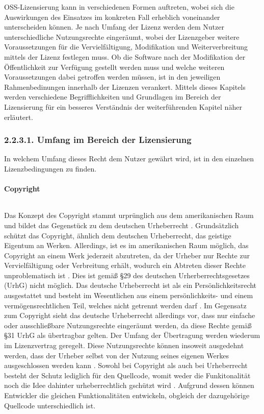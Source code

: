 OSS-Lizensierung kann in verschiedenen Formen auftreten, wobei sich die Auswirkungen des Einsatzes im konkreten Fall erheblich voneinander unterscheiden können. Je nach Umfang der Lizenz werden dem Nutzer unterschiedliche Nutzungsrechte eingeräumt, wobei der Lizenzgeber weitere Voraussetzungen für die Vervielfältigung, Modifikation und Weiterverbreitung mittels der Lizenz festlegen muss. Ob die Software nach der Modifikation der Öffentlichkeit zur Verfügung gestellt werden muss und welche weiteren Voraussetzungen dabei getroffen werden müssen, ist in den jeweiligen Rahmenbedinungen innerhalb der Lizenzen verankert. Mittels dieses Kapitels werden verschiedene Begrifflichkeiten und Grundlagen im Bereich der Lizensierung für ein besseres Verständnis der weiterführenden Kapitel näher erläutert. 

\newpage
\subsubsection{2.2.3.1. Umfang im Bereich der Lizensierung}

In welchem Umfang dieses Recht dem Nutzer gewährt wird, ist in den einzelnen Lizenzbedingungen zu finden. 

\paragraph{Copyright}$~$

Das Konzept des Copyright stammt urprünglich aus dem amerikanischen Raum und bildet das Gegenstück zu dem deutschen Urheberrecht \cite[S. 18]{schaaf_open-source-lizenzen_2013}. Grundsätzlich schützt das Copyright, ähnlich dem deutschen Urheberrecht, das geistige Eigentum an Werken. Allerdings, ist es im amerikanischen Raum möglich, das Copyright an einem Werk jederzeit abzutreten, da der Urheber nur Rechte zur Vervielfältigung oder Verbreitung erhält, wodurch ein Abtreten dieser Rechte unproblematisch ist \cite[S. 45]{bitkom_open_2016}. Dies ist gemäß §29 des deutschen Urherberrechtsgesetzes (UrhG) nicht möglich. Das deutsche Urheberrecht ist als ein Persönlichkeitsrecht ausgestattet und besteht im Wesentlichen aus einem persönlichkeits- und einem vermögensrechtlichen Teil, welches nicht getrennt werden darf \cite[S. 45]{bitkom_open_2016}. Im Gegensatz zum Copyright sieht das deutsche Urheberrecht allerdings vor, dass nur einfache oder ausschließbare Nutzungsrechte eingeräumt werden, da diese Rechte gemäß §31 UrhG als übertragbar gelten. Der Umfang der Übertragung werden wiederum im Lizenzvertrag geregelt. Diese Nutzungsrechte können insoweit ausgedehnt werden, dass der Urheber selbst von der Nutzung seines eigenen Werkes ausgeschlossen werden kann \cite[S. 45]{bitkom_open_2016}. Sowohl bei Copyright als auch bei Urheberrecht besteht der Schutz lediglich für den Quellcode, womit weder die Funkitonalität noch die Idee dahinter urheberrechtlich gschützt wird \cite[S. 18]{schaaf_open-source-lizenzen_2013}. Aufgrund dessen können Entwickler die gleichen Funktionalitäten entwickeln, obgleich der dazugehörige Quellcode unterschiedlich ist.  

